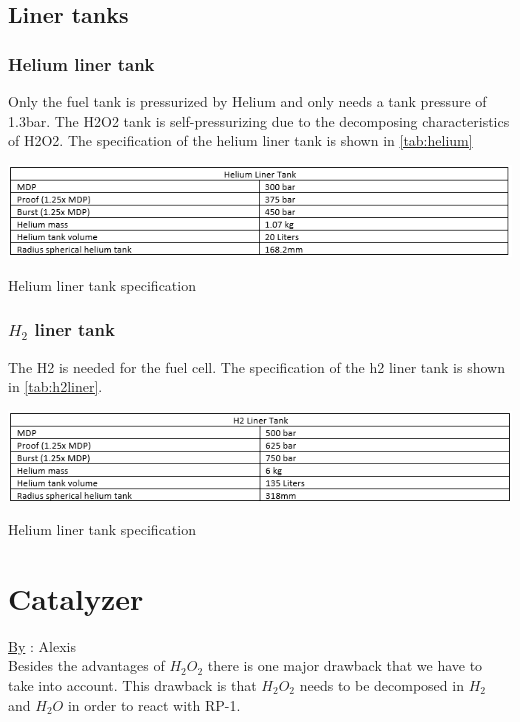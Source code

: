 \subsection{Liner tanks}
\subsubsection{Helium liner tank}

Only the fuel tank is pressurized by Helium and only needs a tank pressure of 1.3bar. The H2O2 tank is self-pressurizing due to the decomposing characteristics of H2O2. The specification of the helium liner tank is shown in \autoref{tab:helium}
\begin{table}[H]
    \centering
    \includegraphics[width = \linewidth]{heliumliner}
    \caption{Helium liner tank specification}\label{tab:helium}
\end{table}{}
\subsubsection{$H_2$ liner tank}
The H2 is needed for the fuel cell. The specification of the h2 liner tank is shown in \autoref{tab:h2liner}.
\begin{table}[H]
    \centering
    \includegraphics[width = \linewidth]{h2liner}
    \caption{Helium liner tank specification}\label{tab:h2liner}
\end{table}{}

\section{Catalyzer}
\qquad \underline{By} : Alexis\\

Besides the advantages of $H_2O_2$ there is one major drawback that we have to take into account. This drawback is that $H_2O_2$ needs to be decomposed in $H_2$ and $H_2O$ in order to react with RP-1. 

